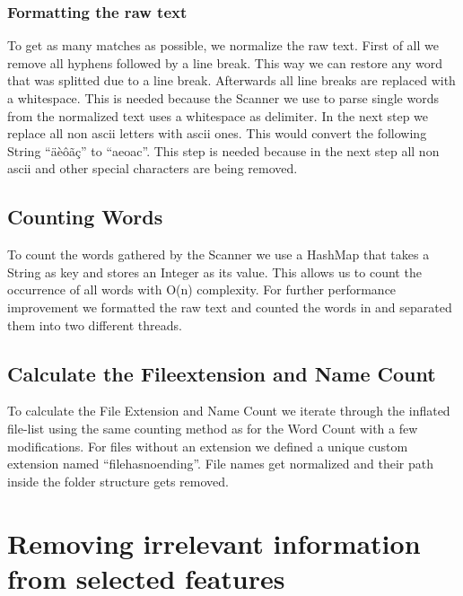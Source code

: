 \documentclass[paper=A4,pagesize=auto,12pt,headinclude=true,footinclude=true,BCOR=0mm,DIV=calc]{scrartcl}
\begin{document}
	
	
	\subsubsection{Formatting the raw text}
	To get as many matches as possible, we normalize the raw text. First of all we remove all hyphens followed by a line break. This way we can restore any word that was splitted due to a line break. Afterwards all line breaks are replaced with a whitespace. This is needed because the Scanner we use to parse single words from the normalized text uses a whitespace as delimiter. In the next step we replace all non ascii letters with ascii ones. This would convert the following String “äèôãç” to “aeoac”. This step is needed because in the next step all non ascii and other special characters are being removed.
	
	\subsection{Counting Words}
	To count the words gathered by the Scanner we use a HashMap that takes a String as key and stores an Integer as its value. This allows us to count the occurrence of all words with O(n) complexity. For further performance improvement we formatted the raw text and counted the words in and separated them into two different threads.
	
	\subsection{Calculate the Fileextension and Name Count}
	
	To calculate the File Extension and Name Count we iterate through the inflated file-list using the same counting method as for the Word Count with a few modifications. For files without an extension we defined a unique custom extension named “filehasnoending”.
	File names get normalized and their path inside the folder structure gets removed.
	
	
	\section{Removing irrelevant information from selected features}
	\label{sec: dictionary}
\end{document}

